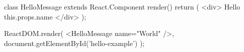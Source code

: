 class HelloMessage extends React.Component {
  render() {
    return (
      <div>
        Hello {this.props.name}
      </div>
    );
  }
}

ReactDOM.render(
  <HelloMessage name="World" />,
  document.getElementById('hello-example')
);